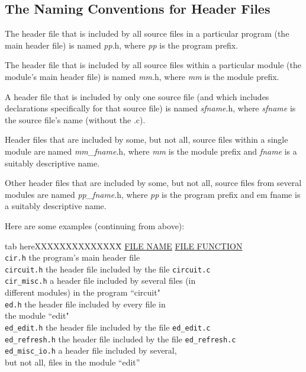 \subsection{The Naming Conventions for Header Files}
The header file that is included by all source files in a particular
program (the main header file) is named {\em pp}.h, where {\em pp} is
the program prefix.

The header file that is included by all source files within a
particular module (the module's main header file) is named {\em mm}.h,
where {\em mm} is the module prefix.

A header file that is included by only one source file (and which
includes declarations specifically for that source file) is named {\em
sfname}.h, where {\em sfname} is the source file's name (without the
.c).

Header files that are included by some, but not all, source files
within a single module are named {\em mm\_fname}.h, where {\em mm} is
the module prefix and {\em fname} is a suitably descriptive name.

Other header files that are included by some, but not all, source
files from several modules are named {\em pp\_fname}.h, where {\em pp}
is the program prefix and {em fname} is a suitably descriptive name.

Here are some examples (continuing from above):

\begin{tabbing}
tab hereXXXXXXXXXXXXXX\= \kill
\underline{FILE NAME}  \>\underline{FILE FUNCTION } \\
{\tt cir.h} \>the program's main header file\\
{\tt circuit.h} \>the header file included by the file {\tt circuit.c}\\
{\tt cir\_misc.h} \>a header file included by several files (in \\
\> different modules) in the program ``circuit" \\
{\tt ed.h} \>the header file included by every file in\\
\>the module ``edit"\\
{\tt ed\_edit.h} \>the header file included by the file {\tt ed\_edit.c} \\
{\tt ed\_refresh.h} \>the header file included by
the file {\tt ed\_refresh.c}\\
{\tt ed\_misc\_io.h} \>a header file included by several,\\
\>but not all, files in the module
``edit''\\
\end{tabbing}

